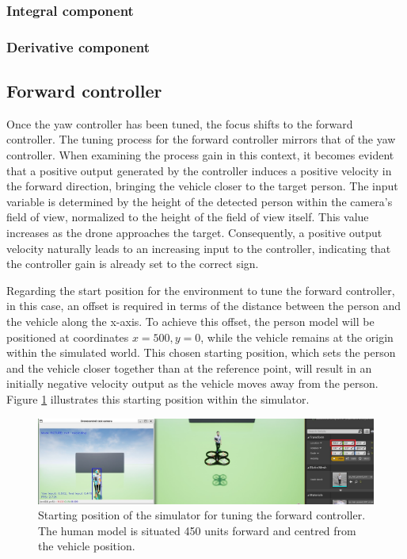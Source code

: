 \subsubsection{Integral component}
\subsubsection{Derivative component}



\subsection{Forward controller}

Once the yaw controller has been tuned, the focus shifts to the forward controller. The tuning process for the forward controller mirrors that of the yaw controller. When examining the process gain in this context, it becomes evident that a positive output generated by the controller induces a positive velocity in the forward direction, bringing the vehicle closer to the target person. The input variable is determined by the height of the detected person within the camera's field of view, normalized to the height of the field of view itself. This value increases as the drone approaches the target. Consequently, a positive output velocity naturally leads to an increasing input to the controller, indicating that the controller gain is already set to the correct sign.

Regarding the start position for the environment to tune the forward controller, in this case, an offset is required in terms of the distance between the person and the vehicle along the x-axis. To achieve this offset, the person model will be positioned at coordinates $x=500, y=0$, while the vehicle remains at the origin within the simulated world. This chosen starting position, which sets the person and the vehicle closer together than at the reference point, will result in an initially negative velocity output as the vehicle moves away from the person. Figure \ref{fig:tune-ref-pos-fwd} illustrates this starting position within the simulator.


\begin{figure}[H]
  \centering
  \includegraphics[width=\textwidth, keepaspectratio]{img/pid/tune-ref-pos-fwd.jpg}
  \caption{Starting position of the simulator for tuning the forward controller. The human model is situated 450 units forward and centred from the vehicle position.}\label{fig:tune-ref-pos-fwd}
\end{figure}

